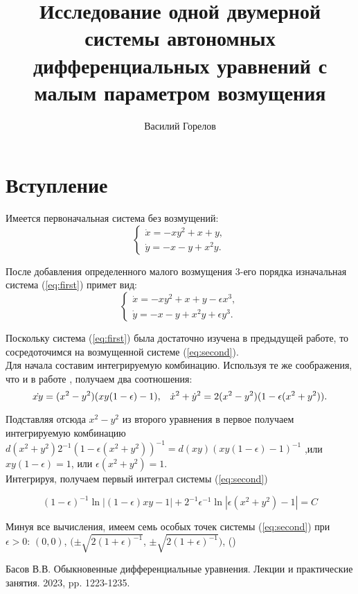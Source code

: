 \documentclass{article}
\title{Исследование одной двумерной системы автономных дифференциальных уравнений с малым параметром возмущения}
\author{Василий Горелов}
\begin{document}
\maketitle

\section{Вступление}
Имеется первоначальная система без возмущений:
\begin{equation}
\begin{cases}
      \dot x=-xy^2+x+y,\\
      \dot y=-x-y+x^2y.
    \end{cases}
    \label{eq:first}
\end{equation}

После добавления определенного малого возмущения 3-его порядка изначальная система (\ref{eq:first}) примет вид:
\begin{equation}
\begin{cases}
      \dot x=-xy^2+x+y-\epsilon x^3,\\
      \dot y=-x-y+x^2y+\epsilon y^3.
    \end{cases}
    \label{eq:second}
\end{equation}

Поскольку система (\ref{eq:first}) была достаточно изучена в предыдущей работе, то сосредоточимся на возмущенной системе (\ref{eq:second}).\\

Для начала составим интегрируемую комбинацию. Используя те же соображения, что и в работе \cite{basov}, получаем два соотношения:
\begin{equation*}
\dot{xy} = (x^2-y^2)(xy(1-\epsilon)-1)\hbox{,\hspace{10pt}} \dot x^2+\dot y^2 = 2(x^2-y^2)(1-\epsilon(x^2+y^2)).
\end{equation*}

Подставляя отсюда $x^2-y^2$ из второго уравнения в первое получаем интегрируемую комбинацию $d(x^2+y^2)2^{-1}(1-\epsilon(x^2+y^2))^{-1}=d(xy)(xy(1-\epsilon)-1)^{-1}$ ,или $xy(1-\epsilon)=1$, или $\epsilon(x^2+y^2)=1$.\\

Интегрируя, получаем первый интеграл системы (\ref{eq:second}) 

\begin{equation}
    (1-\epsilon)^{-1}\ln|(1-\epsilon)xy -1|+2^{-1}\epsilon^{-1}\ln{|\epsilon(x^2+y^2)-1|} = C
\end{equation}

Минуя все вычисления, имеем семь особых точек системы (\ref{eq:second}) при $\epsilon > 0$: $(0,0)$, $(\pm\sqrt{2(1+\epsilon)^{-1}}$, $\pm\sqrt{2(1+\epsilon)^{-1}})$, ()

 \begin{thebibliography}{1}
 Басов В.В. \flqq 	Обыкновенные дифференциальные уравнения. Лекции и практические занятия\frqq. 2023, pp. 1223-1235.
\end{thebibliography}
\end{document}
